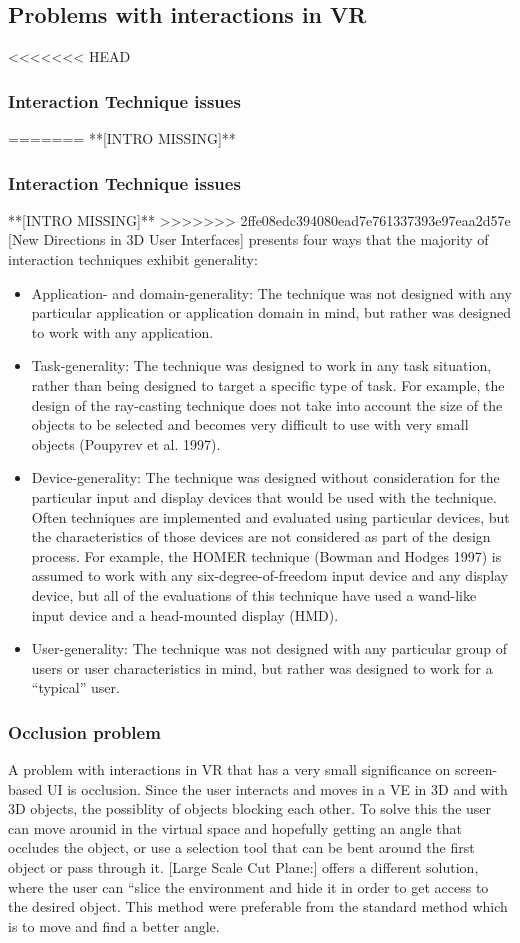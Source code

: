 \subsection{Problems with interactions in VR}
<<<<<<< HEAD

\subsubsection{Interaction Technique issues}
=======
**[INTRO MISSING]**
\subsubsection{Interaction Technique issues}
**[INTRO MISSING]**
>>>>>>> 2ffe08edc394080ead7e761337393e97eaa2d57e
[New Directions in 3D User Interfaces] presents four ways that the majority of interaction techniques exhibit generality:
\begin{itemize}
  \item Application- and domain-generality: The technique was not designed with any particular application or application domain in mind, but rather was designed to work with any application.
  \item Task-generality: The technique was designed to work in any task situation, rather than being designed to target a specific type of task. For example, the design of the ray-casting technique does not take into account the size of the objects to be selected and becomes very difficult to use with very small objects (Poupyrev et al. 1997).
  \item Device-generality: The technique was designed without consideration for the particular input and display devices that would be used with the technique. Often techniques are implemented and evaluated using particular devices, but the characteristics of those devices are not considered as part of the design process. For example, the HOMER technique (Bowman and Hodges 1997) is assumed to work with any six-degree-of-freedom input device and any display device, but all of the evaluations of this technique have used a wand-like input device and a head-mounted display (HMD).
  \item User-generality: The technique was not designed with any particular group of users or user characteristics in mind, but rather was designed to work for a “typical” user.
\end{itemize}

\subsubsection{Occlusion problem}
A problem with interactions in VR that has a very small significance on screen-based UI is occlusion. Since the user interacts and moves in a VE in 3D and with 3D objects, the possiblity of objects blocking each other. To solve this the user can move arounid in the virtual space and hopefully getting an angle that occludes the object, or use a selection tool that can be bent around the first object or pass through it. [Large Scale Cut Plane:] offers a different solution, where the user can “slice the environment and hide it in order to get access to the desired object.
This method were preferable from the standard method which is to move and find a better angle.
